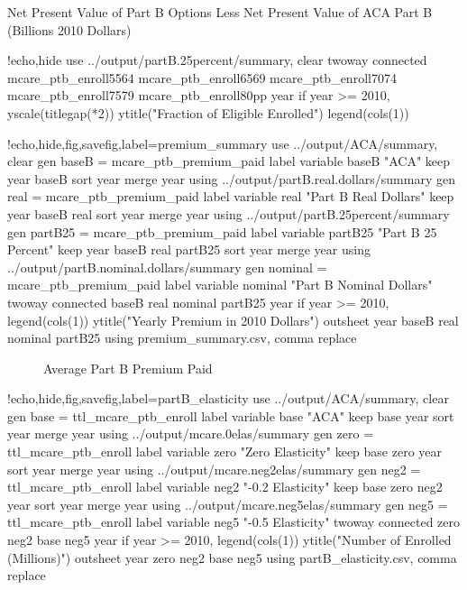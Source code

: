 \documentclass{article}
\begin{document}
\begin{table}[ht]
\centering
\caption{Net Present Value of Part B Options Less Net Present Value of ACA Part B (Billions 2010 Dollars)}
\label{tab:partb_c_cost}
\end{table}

\begin{Statacode}{!echo,hide}
use ../output/partB.25percent/summary, clear
twoway connected mcare_ptb_enroll5564 mcare_ptb_enroll6569 mcare_ptb_enroll7074 mcare_ptb_enroll7579 mcare_ptb_enroll80pp year if year >= 2010, yscale(titlegap(*2)) ytitle("Fraction of Eligible Enrolled") legend(cols(1))
\end{Statacode}

\begin{Statacode}{!echo,hide,fig,savefig,label=premium_summary}
use ../output/ACA/summary, clear
gen baseB = mcare_ptb_premium_paid
label variable baseB "ACA"
keep year baseB
sort year
merge year using ../output/partB.real.dollars/summary
gen real = mcare_ptb_premium_paid
label variable real "Part B Real Dollars"
keep year baseB real
sort year
merge year using ../output/partB.25percent/summary
gen partB25 = mcare_ptb_premium_paid
label variable partB25 "Part B 25 Percent"
keep year baseB real partB25
sort year
merge year using ../output/partB.nominal.dollars/summary
gen nominal = mcare_ptb_premium_paid
label variable nominal "Part B Nominal Dollars"
twoway connected baseB real nominal partB25 year if year >= 2010, legend(cols(1)) ytitle("Yearly Premium in 2010 Dollars")
outsheet year baseB real nominal partB25 using  premium_summary.csv, comma replace
\end{Statacode}

\begin{figure}[ht]
\centering
{}
\caption{Average Part B Premium Paid}
\label{fig:partB_premium}
\end{figure}

\begin{Statacode}{!echo,hide,fig,savefig,label=partB_elasticity}
use ../output/ACA/summary, clear
gen base = ttl_mcare_ptb_enroll
label variable base "ACA"
keep base year
sort year
merge year using ../output/mcare.0elas/summary
gen zero = ttl_mcare_ptb_enroll
label variable zero "Zero Elasticity"
keep base zero year
sort year
merge year using ../output/mcare.neg2elas/summary
gen neg2 = ttl_mcare_ptb_enroll
label variable neg2 "-0.2 Elasticity"
keep base zero neg2 year
sort year
merge year using ../output/mcare.neg5elas/summary
gen neg5 = ttl_mcare_ptb_enroll
label variable neg5 "-0.5 Elasticity"
twoway connected zero neg2 base neg5 year if year >= 2010, legend(cols(1)) ytitle("Number of Enrolled (Millions)")
outsheet year zero neg2 base neg5 using partB_elasticity.csv, comma replace
\end{Statacode}
\end{document}
